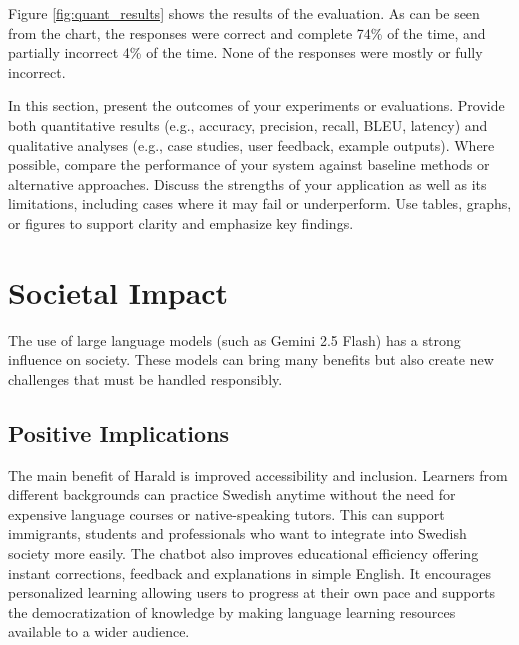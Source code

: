 \documentclass[a4paper,10pt]{article}
\begin{document}
Figure \ref{fig:quant_results} shows the results of the evaluation. As can be seen from the chart, the responses were correct and complete 74\% of the time, and partially incorrect 4\% of the time. None of the responses were mostly or fully incorrect. 

In this section, present the outcomes of your experiments or evaluations. Provide both quantitative results (e.g., accuracy, precision, recall, BLEU, latency) and qualitative analyses (e.g., case studies, user feedback, example outputs). Where possible, compare the performance of your system against baseline methods or alternative approaches. Discuss the strengths of your application as well as its limitations, including cases where it may fail or underperform. Use tables, graphs, or figures to support clarity and emphasize key findings.

\section{Societal Impact}
The use of large language models (such as Gemini 2.5 Flash) has a strong influence on society. These models can bring many benefits but also create new challenges that must be handled responsibly.

\subsection{Positive Implications}
The main benefit of Harald is improved accessibility and inclusion. Learners from different backgrounds can practice Swedish anytime without the need for expensive language courses or native-speaking tutors. This can support immigrants, students and professionals who want to integrate into Swedish society more easily. The chatbot also improves educational efficiency offering instant corrections, feedback and explanations in simple English. It encourages personalized learning allowing users to progress at their own pace and supports the democratization of knowledge by making language learning resources available to a wider audience.
\end{document}
